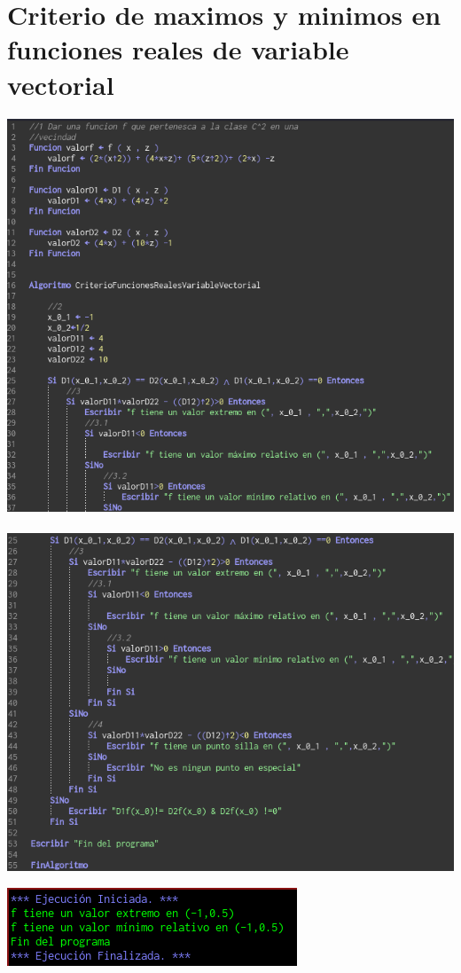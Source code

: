 \documentclass[10pt,a4paper]{article}
\begin{document}
\section{Criterio de maximos y minimos en funciones reales de variable vectorial}
\includegraphics[scale=0.5]{figuras/img5}  \\ \\
\includegraphics[scale=0.5]{figuras/img6}

\includegraphics[scale=0.5]{figuras/img7}
\end{document}
